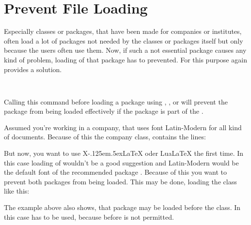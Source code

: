\section{Prevent File Loading}
\label{sec:scrlfile.prevent}

Especially classes or packages, that have
been made for companies or institutes, often load a lot of packages not needed
by the classes or packages itself but only because the users often use
them. Now, if such a not essential package causes any kind of problem, loading
of that package has to prevented. For this purpose  again
provides a solution.

\begin{Declaration}
  \\
\end{Declaration}
%
%
Calling this command before loading a
package using ,
, or
 will
prevent the package from being loaded effectively if the package is part of
the .
%
\begin{Example}
  Assumed you're working in a company, that uses font Latin-Modern for all
  kind of documents. Because of this the company class, 
  contains the lines:
\begin{lstcode}
  \RequirePackage[T1]{fontenc}
  \RequirePackage{lmodern}
\end{lstcode}
  But now, you want to use
  X\kern-.125em\lower.5ex\hbox{}\LaTeX{} oder Lua\LaTeX{} the
  first time. In this case loading of  wouldn't be a good
  suggestion and Latin-Modern would be the default font of the recommended
  package . Because of this you want to prevent both
  packages from being loaded. This may be done, loading the class like this:
\end{Example}
The example above also shows, that package  may be loaded
before the class. In this case 
has to be used, because  before  is not
permitted.

